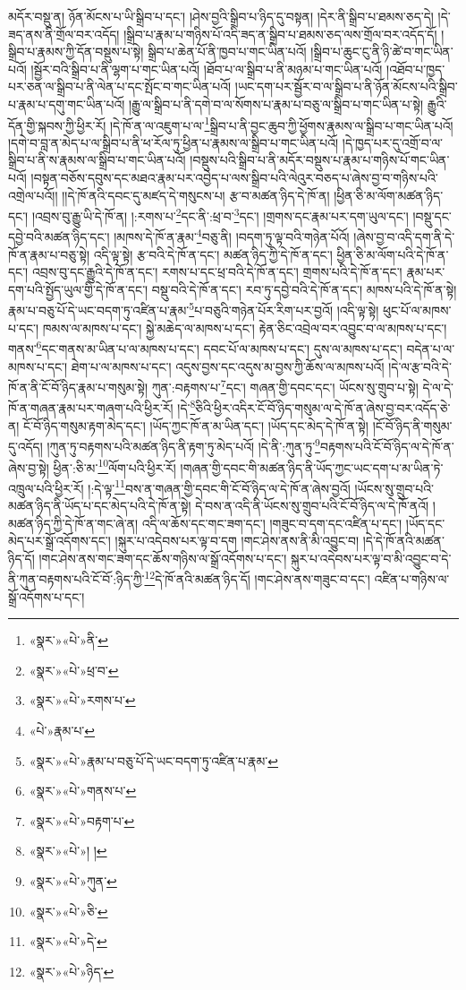 མདོར་བསྡུ་ན། ཉོན་མོངས་པ་ཡི་སྒྲིབ་པ་དང་། །ཤེས་བྱའི་སྒྲིབ་པ་ཉིད་དུ་བསྟན། །དེར་ནི་སྒྲིབ་པ་ཐམས་ཅད་དེ། །དེ་ཟད་ནས་ནི་གྲོལ་བར་འདོད། །སྒྲིབ་པ་རྣམ་པ་གཉིས་པོ་འདི་ཟད་ན་སྒྲིབ་པ་ཐམས་ཅད་ལས་གྲོལ་བར་འདོད་དོ། །སྒྲིབ་པ་རྣམས་ཀྱི་དོན་བསྡུས་པ་སྟེ། སྒྲིབ་པ་ཆེན་པོ་ནི་ཁྱབ་པ་གང་ཡིན་པའོ། །སྒྲིབ་པ་ཆུང་ངུ་ནི་ཉི་ཚེ་བ་གང་ཡིན་པའོ། །སྦྱོར་བའི་སྒྲིབ་པ་ནི་ལྷག་པ་གང་ཡིན་པའོ། །ཐོབ་པ་ལ་སྒྲིབ་པ་ནི་མཉམ་པ་གང་ཡིན་པའོ། །འཐོབ་པ་ཁྱད་པར་ཅན་ལ་སྒྲིབ་པ་ནི་ལེན་པ་དང་སྤོང་བ་གང་ཡིན་པའོ། །ཡང་དག་པར་སྦྱོར་བ་ལ་སྒྲིབ་པ་ནི་ཉོན་མོངས་པའི་སྒྲིབ་པ་རྣམ་པ་དགུ་གང་ཡིན་པའོ། །རྒྱུ་ལ་སྒྲིབ་པ་ནི་དགེ་བ་ལ་སོགས་པ་རྣམ་པ་བཅུ་ལ་སྒྲིབ་པ་གང་ཡིན་པ་སྟེ། རྒྱུའི་དོན་གྱི་སྐབས་ཀྱི་ཕྱིར་རོ། །དེ་ཁོ་ན་ལ་འཇུག་པ་ལ་\footnote{«སྣར་»«པེ་»ནི་}སྒྲིབ་པ་ནི་བྱང་ཆུབ་ཀྱི་ཕྱོགས་རྣམས་ལ་སྒྲིབ་པ་གང་ཡིན་པའོ། །དགེ་བ་བླ་ན་མེད་པ་ལ་སྒྲིབ་པ་ནི་ཕ་རོལ་ཏུ་ཕྱིན་པ་རྣམས་ལ་སྒྲིབ་པ་གང་ཡིན་པའོ། །དེ་ཁྱད་པར་དུ་འགྲོ་བ་ལ་སྒྲིབ་པ་ནི་ས་རྣམས་ལ་སྒྲིབ་པ་གང་ཡིན་པའོ། །བསྡུས་པའི་སྒྲིབ་པ་ནི་མདོར་བསྡུས་པ་རྣམ་པ་གཉིས་པོ་གང་ཡིན་པའོ། །བསྟན་བཅོས་དབུས་དང་མཐའ་རྣམ་པར་འབྱེད་པ་ལས་སྒྲིབ་པའི་ལེའུར་བཅད་པ་ཞེས་བྱ་བ་གཉིས་པའི་འགྲེལ་པའོ།། །།དེ་ཁོ་ནའི་དབང་དུ་མཛད་དེ་གསུངས་པ། རྩ་བ་མཚན་ཉིད་དེ་ཁོ་ན། །ཕྱིན་ཅི་མ་ལོག་མཚན་ཉིད་དང་། །འབྲས་བུ་རྒྱུ་ཡི་དེ་ཁོ་ན། །:རགས་པ་\footnote{«སྣར་»«པེ་»ཕྲ་བ་}དང་ནི་:ཕྲ་བ་\footnote{«སྣར་»«པེ་»རགས་པ་}དང་། །གྲགས་དང་རྣམ་པར་དག་ཡུལ་དང་། །བསྡུ་དང་དབྱེ་བའི་མཚན་ཉིད་དང་། །མཁས་དེ་ཁོ་ན་རྣམ་\footnote{«པེ་»རྣམ་པ་}བཅུ་ནི། །བདག་ཏུ་ལྟ་བའི་གཉེན་པོའོ། །ཞེས་བྱ་བ་འདི་དག་ནི་དེ་ཁོ་ན་རྣམ་པ་བཅུ་སྟེ། འདི་ལྟ་སྟེ། རྩ་བའི་དེ་ཁོ་ན་དང་། མཚན་ཉིད་ཀྱི་དེ་ཁོ་ན་དང་། ཕྱིན་ཅི་མ་ལོག་པའི་དེ་ཁོ་ན་དང་། འབྲས་བུ་དང་རྒྱུའི་དེ་ཁོ་ན་དང་། རགས་པ་དང་ཕྲ་བའི་དེ་ཁོ་ན་དང་། གྲགས་པའི་དེ་ཁོ་ན་དང་། རྣམ་པར་དག་པའི་སྤྱོད་ཡུལ་གྱི་དེ་ཁོ་ན་དང་། བསྡུ་བའི་དེ་ཁོ་ན་དང་། རབ་ཏུ་དབྱེ་བའི་དེ་ཁོ་ན་དང་། མཁས་པའི་དེ་ཁོ་ན་སྟེ། རྣམ་པ་བཅུ་པོ་དེ་ཡང་བདག་ཏུ་འཛིན་པ་རྣམ་\footnote{«སྣར་»«པེ་»རྣམ་པ་བཅུ་པོ་དེ་ཡང་བདག་ཏུ་འཛིན་པ་རྣམ་}པ་བཅུའི་གཉེན་པོར་རིག་པར་བྱའོ། །འདི་ལྟ་སྟེ། ཕུང་པོ་ལ་མཁས་པ་དང་། ཁམས་ལ་མཁས་པ་དང་། སྐྱེ་མཆེད་ལ་མཁས་པ་དང་། རྟེན་ཅིང་འབྲེལ་བར་འབྱུང་བ་ལ་མཁས་པ་དང་། གནས་\footnote{«སྣར་»«པེ་»གནས་པ་}དང་གནས་མ་ཡིན་པ་ལ་མཁས་པ་དང་། དབང་པོ་ལ་མཁས་པ་དང་། དུས་ལ་མཁས་པ་དང་། བདེན་པ་ལ་མཁས་པ་དང་། ཐེག་པ་ལ་མཁས་པ་དང་། འདུས་བྱས་དང་འདུས་མ་བྱས་ཀྱི་ཆོས་ལ་མཁས་པའོ། །དེ་ལ་རྩ་བའི་དེ་ཁོ་ན་ནི་ངོ་བོ་ཉིད་རྣམ་པ་གསུམ་སྟེ། ཀུན་:བརྟགས་པ་\footnote{«སྣར་»«པེ་»བརྟག་པ་}དང་། གཞན་གྱི་དབང་དང་། ཡོངས་སུ་གྲུབ་པ་སྟེ། དེ་ལ་དེ་ཁོ་ན་གཞན་རྣམ་པར་གཞག་པའི་ཕྱིར་རོ། །དེ་\footnote{«སྣར་»«པེ་»། །}ཅིའི་ཕྱིར་འདིར་ངོ་བོ་ཉིད་གསུམ་ལ་དེ་ཁོ་ན་ཞེས་བྱ་བར་འདོད་ཅེ་ན། ངོ་བོ་ཉིད་གསུམ་རྟག་མེད་དང་། །ཡོད་ཀྱང་ཁོ་ན་མ་ཡིན་དང་། །ཡོད་དང་མེད་དེ་ཁོ་ན་སྟེ། །ངོ་བོ་ཉིད་ནི་གསུམ་དུ་འདོད། །ཀུན་ཏུ་བརྟགས་པའི་མཚན་ཉིད་ནི་རྟག་ཏུ་མེད་པའོ། །དེ་ནི་:ཀུན་ཏུ་\footnote{«སྣར་»«པེ་»ཀུན་}བརྟགས་པའི་ངོ་བོ་ཉིད་ལ་དེ་ཁོ་ན་ཞེས་བྱ་སྟེ། ཕྱིན་:ཅི་མ་\footnote{«སྣར་»«པེ་»ཅི་}ལོག་པའི་ཕྱིར་རོ། །གཞན་གྱི་དབང་གི་མཚན་ཉིད་ནི་ཡོད་ཀྱང་ཡང་དག་པ་མ་ཡིན་ཏེ་འཁྲུལ་པའི་ཕྱིར་རོ། །:དེ་ལྟ་\footnote{«སྣར་»«པེ་»དེ་}བས་ན་གཞན་གྱི་དབང་གི་ངོ་བོ་ཉིད་ལ་དེ་ཁོ་ན་ཞེས་བྱའོ། །ཡོངས་སུ་གྲུབ་པའི་མཚན་ཉིད་ནི་ཡོད་པ་དང་མེད་པའི་དེ་ཁོ་ན་སྟེ། དེ་བས་ན་འདི་ནི་ཡོངས་སུ་གྲུབ་པའི་ངོ་བོ་ཉིད་ལ་དེ་ཁོ་ནའོ། །མཚན་ཉིད་ཀྱི་དེ་ཁོ་ན་གང་ཞེ་ན། འདི་ལ་ཆོས་དང་གང་ཟག་དང་། །གཟུང་བ་དག་དང་འཛིན་པ་དང་། །ཡོད་དང་མེད་པར་སྒྲོ་འདོགས་དང་། །སྐུར་པ་འདེབས་པར་ལྟ་བ་དག །གང་ཤེས་ནས་ནི་མི་འབྱུང་བ། །དེ་དེ་ཁོ་ནའི་མཚན་ཉིད་དོ། །གང་ཤེས་ནས་གང་ཟག་དང་ཆོས་གཉིས་ལ་སྒྲོ་འདོགས་པ་དང་། སྐུར་པ་འདེབས་པར་ལྟ་བ་མི་འབྱུང་བ་དེ་ནི་ཀུན་བརྟགས་པའི་ངོ་བོ་:ཉིད་ཀྱི་\footnote{«སྣར་»«པེ་»ཉིད་}དེ་ཁོ་ནའི་མཚན་ཉིད་དོ། །གང་ཤེས་ནས་གཟུང་བ་དང་། འཛིན་པ་གཉིས་ལ་སྒྲོ་འདོགས་པ་དང་། 